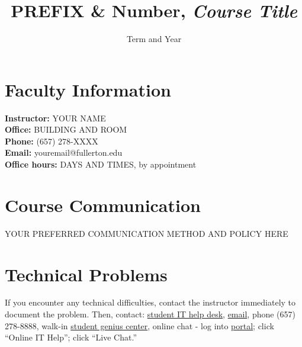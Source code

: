 \documentclass[12pt]{article}
\title{PREFIX \& Number, \textit{Course Title}}
\author{}  %
\date{Term and Year}
\begin{document}


\maketitle

\section*{Faculty Information}
\noindent \textbf{Instructor:} YOUR NAME \\
\noindent \textbf{Office:} BUILDING AND ROOM \\
\noindent \textbf{Phone:} (657) 278-XXXX \\
\noindent \textbf{Email:} youremail@fullerton.edu \\
\noindent \textbf{Office hours:} DAYS AND TIMES, by appointment

\section*{Course Communication}
YOUR PREFERRED COMMUNICATION METHOD AND POLICY HERE

\section*{Technical Problems}
If you encounter any technical difficulties, contact the instructor immediately to document the problem. Then, contact: \href{http://www.fullerton.edu/it/students/helpdesk/index.php}{student IT help desk}, \href{mailto:StudentITHelpDesk@fullerton.edu}{email}, phone (657) 278-8888, walk-in \href{http://www.fullerton.edu/it/students/sgc/index.php}{student genius center}, online chat - log into \href{http://my.fullerton.edu}{portal}; click ``Online IT Help''; click ``Live Chat.''
\end{document}
